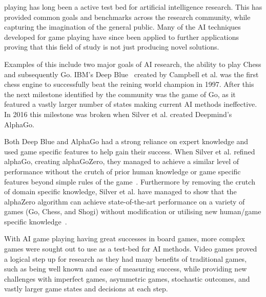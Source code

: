  playing has long been a active test bed for artificial intelligence research.
This has provided common goals and benchmarks across the research community, while capturing the imagination of the general public.
Many of the AI techniques developed for game playing have since been applied to further applications proving that this field of study is not just producing novel solutions.
\par
Examples of this include two major goals of AI research, the ability to play Chess and subsequently Go.
IBM's Deep Blue~\cite{deepBlue} created by Campbell et al. was the first chess engine to successfully beat the reining world champion in 1997.
After this the next milestone identified by the community was the game of Go, as it featured a vastly larger number of states making current AI methods ineffective. 
In 2016 this milestone was broken when Silver et al. created Deepmind's AlphaGo.
\par
Both Deep Blue and AlphaGo had a strong reliance on expert knowledge and used game specific features to help gain their success.
When Silver et al. refined alphaGo, creating alphaGoZero, they managed to achieve a similar level of performance without the crutch of prior human knowledge or game specific features beyond simple rules of the game~\cite{alphaGoZero}.
Furthermore by removing the crutch of domain specific knowledge, Silver et al. have managed to show that the alphaZero algorithm can achieve state-of-the-art performance on a variety of games (Go, Chess, and Shogi) without modification or utilising new human/game specific knowledge~\cite{alphaZero}.
\par
With AI game playing having great successes in board games, more complex games were sought out to use as a test-bed for AI methods.
Video games proved a logical step up for research as they had many benefits of traditional games, such as being well known and ease of measuring success, while providing new challenges with imperfect games, asymmetric games, stochastic outcomes, and vastly larger game states and decisions at each step.